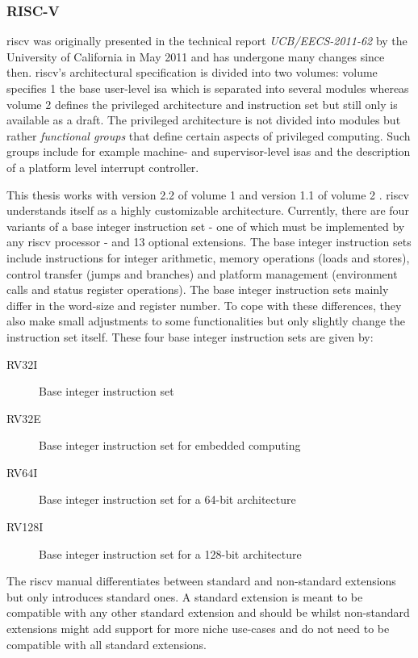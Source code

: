 \subsubsection{RISC-V}

\gls{riscv} was originally presented in the technical report \textit{UCB/EECS-2011-62} by the University of California in May 2011 \cite{RiscVISA-org} and has undergone many changes since then.
\gls{riscv}'s architectural specification is divided into two volumes: volume specifies 1 the base user-level \gls{isa} which is separated into several modules whereas volume 2 defines the privileged architecture and instruction set but still only is available as a draft.
The privileged architecture is not divided into modules but rather \textit{functional groups} that define certain aspects of privileged computing.
Such groups include for example machine- and supervisor-level \glspl{isa} and the description of a platform level interrupt controller.


This thesis works with version 2.2 of volume 1 \cite{RiscVISA} and version 1.1 of volume 2 \cite{RiscVISAP}.
\gls{riscv} understands itself as a highly customizable architecture.
Currently, there are four variants of a base integer instruction set - one of which must be implemented by any \gls{riscv} processor - and 13 optional extensions.
The base integer instruction sets include instructions for integer arithmetic, memory operations (loads and stores), control transfer (jumps and branches) and platform management (environment calls and status register operations).
The base integer instruction sets mainly differ in the word-size and register number.
To cope with these differences, they also make small adjustments to some functionalities but only slightly change the instruction set itself.
These four base integer instruction sets are given by:
\begin{description}
    \item[RV32I] Base integer instruction set
    \item[RV32E] Base integer instruction set for embedded computing
    \item[RV64I] Base integer instruction set for a 64-bit architecture
    \item[RV128I] Base integer instruction set for a 128-bit architecture
\end{description}

The \gls{riscv} manual differentiates between standard and non-standard extensions but only introduces standard ones.
A standard extension is meant to be compatible with any other standard extension and should be  whilst non-standard extensions might add support for more niche use-cases and do not need to be compatible with all standard extensions.

